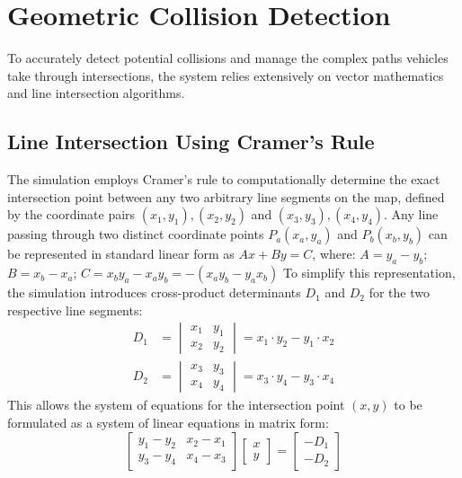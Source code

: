 \documentclass[../report_main.tex]{subfiles}
\begin{document}
\section{Geometric Collision Detection}
To accurately detect potential collisions and manage the complex paths vehicles take through intersections, the system relies extensively on vector mathematics and line intersection algorithms. 

\subsection{Line Intersection Using Cramer's Rule}

The simulation employs Cramer's rule \cite{daisoToan} to computationally determine the exact intersection point between any two arbitrary line segments on the map, defined by the coordinate pairs $(x_1, y_1), (x_2, y_2)$ and $(x_3, y_3), (x_4, y_4)$. Any line passing through two distinct coordinate points ${P_a(x_a, y_a)}$ and $P_b(x_b, y_b)$ can be represented in standard linear form as ${A x + B y = C}$, where: ${A = y_a - y_b}$; ${B = x_b - x_a}$; ${C = x_b y_a - x_a y_b = - (x_a y_b - y_a x_b)}$ To simplify this representation, the simulation introduces cross-product determinants $D_1$ and $D_2$ for the two respective line segments:
\begin{align}
    D_1 &= \begin{vmatrix} x_1 & y_1 \\ x_2 & y_2 \end{vmatrix} = x_1 \cdot y_2 - y_1 \cdot x_2 \\
    D_2 &= \begin{vmatrix} x_3 & y_3 \\ x_4 & y_4 \end{vmatrix} = x_3 \cdot y_4 - y_3 \cdot x_4
\end{align}
This allows the system of equations for the intersection point $(x,y)$ to be formulated as a system of linear equations in matrix form:
\begin{equation}
    \begin{bmatrix}
        y_1 - y_2 & x_2 - x_1 \\
        y_3 - y_4 & x_4 - x_3
    \end{bmatrix}
    \begin{bmatrix}
        x \\
        y
    \end{bmatrix}
    =
    \begin{bmatrix}
        -D_1 \\
        -D_2
    \end{bmatrix}
\end{equation}
\end{document}
